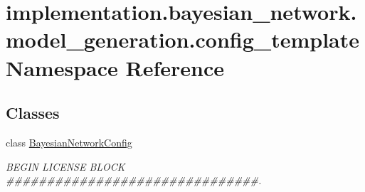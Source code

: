 \hypertarget{namespaceimplementation_1_1bayesian__network_1_1model__generation_1_1config__template}{}\section{implementation.\+bayesian\+\_\+network.\+model\+\_\+generation.\+config\+\_\+template Namespace Reference}
\label{namespaceimplementation_1_1bayesian__network_1_1model__generation_1_1config__template}
\subsection*{Classes}
\begin{DoxyCompactItemize}
\item 
class \hyperlink{classimplementation_1_1bayesian__network_1_1model__generation_1_1config__template_1_1_bayesian_network_config}{Bayesian\+Network\+Config}
\begin{DoxyCompactList}\small\item\em B\+E\+G\+IN L\+I\+C\+E\+N\+SE B\+L\+O\+CK \#\#\#\#\#\#\#\#\#\#\#\#\#\#\#\#\#\#\#\#\#\#\#\#\#\#\#\#\#\#\#. \end{DoxyCompactList}\end{DoxyCompactItemize}
